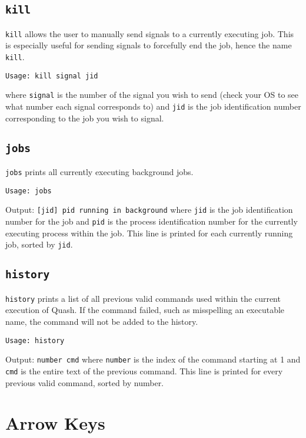\documentclass[12pt]{article}
\begin{document}
\subsection{\texttt{kill}}
\label{sec:org83991bb}
\texttt{kill} allows the user to manually send signals to a currently executing
job. This is especially useful for sending signals to forcefully end the job,
hence the name \texttt{kill}.
\begin{verbatim}
Usage: kill signal jid
\end{verbatim}
where \texttt{signal} is the number of the signal you wish to send (check your OS to
see what number each signal corresponds to) and \texttt{jid} is the job identification
number corresponding to the job you wish to signal.
\subsection{\texttt{jobs}}
\label{sec:org2f06d88}
\texttt{jobs} prints all currently executing background jobs.
\begin{verbatim}
Usage: jobs
\end{verbatim}
Output: \texttt{[jid] pid running in background} where \texttt{jid} is the job identification
number for the job and \texttt{pid} is the process identification number for the
currently executing process within the job. This line is printed for each
currently running job, sorted by \texttt{jid}.
\subsection{\texttt{history}}
\label{sec:orgb5c19d0}
\texttt{history} prints a list of all previous valid commands used within the current
execution of Quash. If the command failed, such as misspelling an executable
name, the command will not be added to the history.
\begin{verbatim}
Usage: history
\end{verbatim}
Output: \texttt{number cmd} where \texttt{number} is the index of the command starting
at 1 and \texttt{cmd} is the entire text of the previous command. This line is printed
for every previous valid command, sorted by number. 
\section{Arrow Keys}
\label{sec:org411da29}
\end{document}
